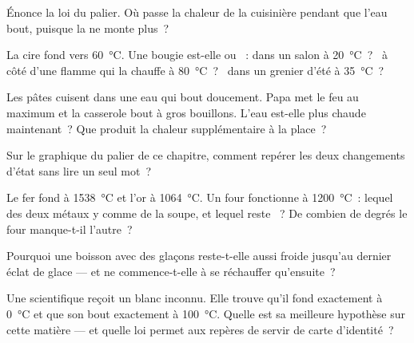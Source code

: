 \begin{exercise}[$\star$]\label{exo:g4:changes-of-state:4}
Énonce la loi du palier. Où passe la chaleur de la cuisinière pendant
que l'eau bout, puisque la  ne monte plus~?
\end{exercise}

\begin{exercise}[$\star$]\label{exo:g4:changes-of-state:5}
La cire fond vers \qty{60}{\celsius}. Une bougie est-elle  ou
~: dans un salon à \qty{20}{\celsius}~? \ à côté d'une flamme
qui la chauffe à \qty{80}{\celsius}~? \ dans un grenier d'été à
\qty{35}{\celsius}~?
\end{exercise}

\begin{exercise}[$\star$]\label{exo:g4:changes-of-state:6}
Les pâtes cuisent dans une eau qui bout doucement. Papa met le feu au
maximum et la casserole bout à gros bouillons. L'eau est-elle plus
chaude maintenant~? Que produit la chaleur supplémentaire à la
place~?
\end{exercise}

\begin{exercise}[$\star$]\label{exo:g4:changes-of-state:7}
Sur le graphique du palier de ce chapitre, comment repérer les deux
changements d'état sans lire un seul mot~?
\end{exercise}

\begin{exercise}[$\star$]\label{exo:g4:changes-of-state:8}
Le fer fond à \qty{1538}{\celsius} et l'or à \qty{1064}{\celsius}. Un
four fonctionne à \qty{1200}{\celsius}~: lequel des deux métaux y
 comme de la soupe, et lequel reste ~? De combien de
degrés le four manque-t-il l'autre~?
\end{exercise}

\begin{exercise}[$\star$]\label{exo:g4:changes-of-state:9}
Pourquoi une boisson avec des glaçons reste-t-elle aussi froide
jusqu'au dernier éclat de glace --- et ne commence-t-elle à se
réchauffer qu'ensuite~?
\end{exercise}

\begin{exercise}[$\star\star$]\label{exo:g4:changes-of-state:10}
Une scientifique reçoit un  blanc inconnu. Elle trouve qu'il
fond exactement à \qty{0}{\celsius} et que son  bout
exactement à \qty{100}{\celsius}. Quelle est sa meilleure hypothèse
sur cette matière --- et quelle loi permet aux repères de servir de
carte d'identité~?
\end{exercise}

